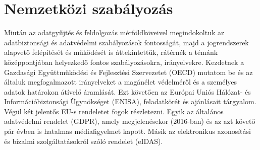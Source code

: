 \chapter{Nemzetközi szabályozás}

Miután az adatgyűjtés és feldolgozás mérföldköveivel megindokoltuk az adatbiztonsági és adatvédelmi szabályozások fontosságát, majd a jogrendszerek alapvető felépítését és működését is áttekintettük, rátérnék a témánk középpontjában helyezkedő fontos szabályozásokra, irányelvekre. Kezdetnek a Gazdasági Együttműködési és Fejlesztési Szervezetet (OECD) mutatom be és az általuk megfogalmazott irányelveket a magánélet védelméről és a személyes adatok határokon átívelő áramlását. Ezt követően az Európai Uniós Hálózat- és Információbiztonsági Ügynökséget (ENISA), feladatkörét és ajánlásait tárgyalom. Végül két jelentős EU-s rendeletet fogok részletezni. Egyik az általános adatvédelmi rendelet (GDPR), amely megjelenésekor (2016-ban) és az azt követő pár évben is hatalmas médiafigyelmet kapott. Másik az elektronikus azonosítási és bizalmi szolgáltatásokról szóló rendelet (eIDAS).




